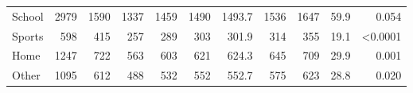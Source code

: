 \begin{table}[H]
{\begin{tabular}{l|rr|rrrrrrr|r}
\multicolumn{1}{|l|}{School}                          & {\color[HTML]{9B9B9B} 2979}                                     & 1590                                                             & {\color[HTML]{9B9B9B} 1337}                     & {\color[HTML]{9B9B9B} 1459}                    & {\color[HTML]{9B9B9B} 1490}                        & 1493.7                                              & {\color[HTML]{9B9B9B} 1536}                    & {\color[HTML]{9B9B9B} 1647}                     & {\color[HTML]{9B9B9B} 59.9}                     & \multicolumn{1}{r|}{0.054}                           \\
\multicolumn{1}{|l|}{Sports}                          & {\color[HTML]{9B9B9B} 598}                                      & 415                                                              & {\color[HTML]{9B9B9B} 257}                      & {\color[HTML]{9B9B9B} 289}                     & {\color[HTML]{9B9B9B} 303}                         & 301.9                                               & {\color[HTML]{9B9B9B} 314}                     & {\color[HTML]{9B9B9B} 355}                      & {\color[HTML]{9B9B9B} 19.1}                     & \multicolumn{1}{r|}{\textless{}0.0001}               \\
\multicolumn{1}{|l|}{Home}                            & {\color[HTML]{9B9B9B} 1247}                                     & 722                                                              & {\color[HTML]{9B9B9B} 563}                      & {\color[HTML]{9B9B9B} 603}                     & {\color[HTML]{9B9B9B} 621}                         & 624.3                                               & {\color[HTML]{9B9B9B} 645}                     & {\color[HTML]{9B9B9B} 709}                      & {\color[HTML]{9B9B9B} 29.9}                     & \multicolumn{1}{r|}{0.001}                           \\
\multicolumn{1}{|l|}{Other}                           & {\color[HTML]{9B9B9B} 1095}                                     & 612                                                              & {\color[HTML]{9B9B9B} 488}                      & {\color[HTML]{9B9B9B} 532}                     & {\color[HTML]{9B9B9B} 552}                         & 552.7                                               & {\color[HTML]{9B9B9B} 575}                     & {\color[HTML]{9B9B9B} 623}                      & {\color[HTML]{9B9B9B} 28.8}                     & \multicolumn{1}{r|}{0.020}                           \\ \hline
\end{tabular}

}



\end{table}

